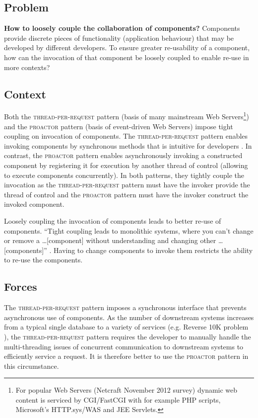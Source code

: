 \documentclass[prodmode]{style/acmlarge}
\begin{document}
\subsection{Problem}

\textbf{How to loosely couple the collaboration of components?}  Components
provide discrete pieces of functionality (application behaviour) that may be
developed by different developers.  To ensure greater re-usability of a
component, how can the invocation of that component be loosely coupled to enable
re-use in more contexts?


\subsection{Context}

Both the \textsc{thread-per-request} pattern \cite{thread-per-request} (basis of
many mainstream Web Servers\footnote{For popular Web Servers (Netcraft November
2012 survey) dynamic web content is serviced by CGI/FastCGI with for example PHP
scripts, Microsoft's HTTP.sys/WAS and JEE Servlets.}) and the \textsc{proactor}
pattern \cite{proactor} (basis of event-driven Web Servers) impose tight
coupling on invocation of components.  The \textsc{thread-per-request} pattern
enables invoking components by synchronous methods that is intuitive for
developers \cite[p. 2]{proactor}.  In contrast, the \textsc{proactor} pattern
enables asynchronously invoking a constructed component by registering it for
execution by another thread of control (allowing to execute components
concurrently).  In both patterns, they tightly couple the invocation as the
\textsc{thread-per-request} pattern must have the invoker provide the thread of
control and the \textsc{proactor} pattern must have the invoker construct the
invoked component.

Loosely coupling the invocation of components leads to better re-use of
components.  ``Tight coupling leads to monolithic systems, where you can't
change or remove a \ldots [component] without understanding and changing other
\ldots [components]'' \cite[p. 24-25]{gof}.  Having to change components to
invoke them restricts the ability to re-use the components.


\subsection{Forces}

The \textsc{thread-per-request} pattern imposes a synchronous interface that
prevents asynchronous use of components.  As the number of downstream
systems increases from a typical single database to a variety of services (e.g.
Reverse 10K problem \cite{reverse-ten-k-problem}), the
\textsc{thread-per-request} pattern requires the developer to manually handle
the multi-threading issues of concurrent communication to downstream systems to
efficiently service a request.  It is therefore better to use the
\textsc{proactor} pattern in this circumstance.
\end{document}
